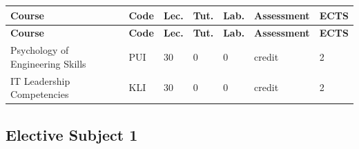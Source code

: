 \documentclass[12pt,a4paper]{article}
\newcommand{\thdrule}{\noalign{\global\setlength{\extrarowheight}{0pt}}}
\newcommand{\thdend}{\noalign{\global\setlength{\extrarowheight}{4pt}}}
\begin{document}
{\scriptsize
\begin{longtable}{m{5.5cm}m{0.8cm}m{1cm}m{1cm}m{1cm}m{1.7cm}m{0.7cm}}
\thdrule\toprule
\rowcolor{pjatkRed}
{\color{white}\footnotesize\textbf{\vphantom{Ag}Course}} & {\color{white}\footnotesize\textbf{\vphantom{Ag}Code}} & {\color{white}\footnotesize\textbf{\vphantom{Ag}Lec.}} & {\color{white}\footnotesize\textbf{\vphantom{Ag}Tut.}} & {\color{white}\footnotesize\textbf{\vphantom{Ag}Lab.}} & {\color{white}\footnotesize\textbf{\vphantom{Ag}Assessment}} & {\color{white}\footnotesize\textbf{\vphantom{Ag}ECTS}} \\
\midrule\thdend
\endfirsthead
\thdrule\toprule
\rowcolor{pjatkRed}
{\color{white}\footnotesize\textbf{\vphantom{Ag}Course}} & {\color{white}\footnotesize\textbf{\vphantom{Ag}Code}} & {\color{white}\footnotesize\textbf{\vphantom{Ag}Lec.}} & {\color{white}\footnotesize\textbf{\vphantom{Ag}Tut.}} & {\color{white}\footnotesize\textbf{\vphantom{Ag}Lab.}} & {\color{white}\footnotesize\textbf{\vphantom{Ag}Assessment}} & {\color{white}\footnotesize\textbf{\vphantom{Ag}ECTS}} \\
\midrule\thdend
\endhead
\rowcolor{tableRowLight} Psychology of Engineering Skills & PUI & 30 & 0 & 0 & {\scriptsize credit} & 2 \\
\rowcolor{tableRowAlt} IT Leadership Competencies & KLI & 30 & 0 & 0 & {\scriptsize credit} & 2 \\
\bottomrule
\end{longtable}}

\subsection*{Elective Subject 1}
\end{document}
